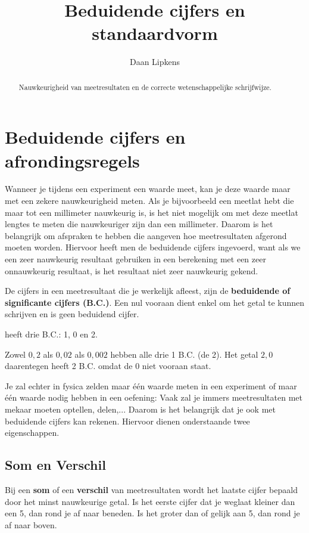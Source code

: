 \documentclass{ximera}
\title{Beduidende cijfers en standaardvorm}
\author{Daan Lipkens}
\begin{document}
\begin{abstract}
    Nauwkeurigheid van meetresultaten en de correcte wetenschappelijke schrijfwijze.
\end{abstract}
\maketitle

\section{Beduidende cijfers en afrondingsregels}
Wanneer je tijdens een experiment een waarde meet, kan je deze waarde maar met een zekere nauwkeurigheid meten. Als je bijvoorbeeld een meetlat hebt die maar tot een millimeter nauwkeurig is, is het niet mogelijk om met deze meetlat lengtes te meten die nauwkeuriger zijn dan een millimeter. Daarom is het belangrijk om afspraken te hebben die aangeven hoe meetresultaten afgerond moeten worden. Hiervoor heeft men de beduidende cijfers ingevoerd, want als we een zeer nauwkeurig resultaat gebruiken in een berekening met een zeer onnauwkeurig resultaat, is het resultaat niet zeer nauwkeurig gekend.

\begin{definition}\nl
    De cijfers in een meetresultaat die je werkelijk afleest, zijn de \textbf{beduidende of significante cijfers (B.C.)}. Een nul vooraan dient enkel om het getal te kunnen schrijven en is geen beduidend cijfer.
\end{definition}

\begin{example}[title={Aantal B.C.}] heeft drie B.C.: 1, 0 en 2.
\end{example}

\begin{example}[title={Aantal B.C.}]\nl
    Zowel $0{,}2$ als $0{,}02$ als $0{,}002$ hebben alle drie 1 B.C. (de 2). Het getal $2{,}0$ daarentegen heeft 2 B.C. omdat de 0 niet vooraan staat.
\end{example}

Je zal echter in fysica zelden maar één waarde meten in een experiment of maar één waarde nodig hebben in een oefening: Vaak zal je immers meetresultaten met mekaar moeten optellen, delen,... Daarom is het belangrijk dat je ook met beduidende cijfers kan rekenen. Hiervoor dienen onderstaande twee eigenschappen.

\subsection{Som en Verschil}
\begin{proposition}\nl
    Bij een \textbf{som} of een \textbf{verschil} van meetresultaten wordt het laatste cijfer bepaald door het minst nauwkeurige getal. Is het eerste cijfer dat je weglaat kleiner dan een 5, dan rond je af naar beneden. Is het groter dan of gelijk aan 5, dan rond je af naar boven.
\end{proposition}
\end{document}
